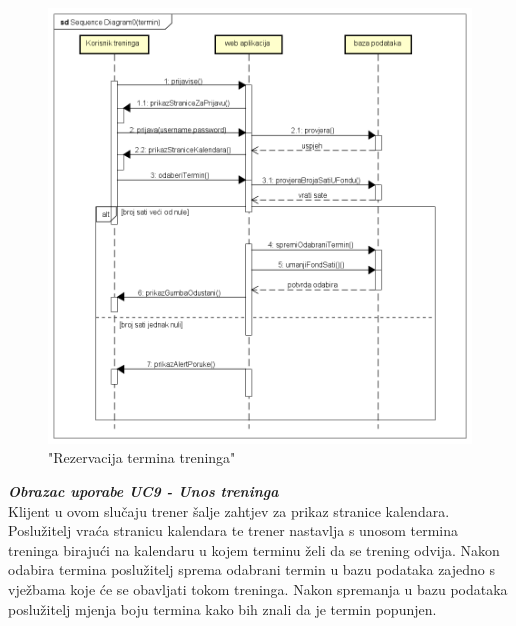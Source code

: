 {				
				\begin{figure}[H]
					\includegraphics[scale=0.6]{dijagrami/UC7fixedsequental.png} %
					\centering
					\caption{"Rezervacija termina treninga"}
					\label{fig:sekvencijski2}
				\end{figure}
				
				\eject
				
				\textbf{\textit{Obrazac uporabe UC9 - Unos treninga}}\\
				
				
				{Klijent u ovom slučaju trener šalje zahtjev za prikaz stranice kalendara. Poslužitelj vraća stranicu kalendara te trener nastavlja s unosom termina treninga birajući na kalendaru u kojem terminu želi da se trening odvija. Nakon odabira termina poslužitelj sprema odabrani termin u bazu podataka zajedno s vježbama koje će se obavljati tokom treninga. Nakon spremanja u bazu podataka poslužitelj mjenja boju termina kako bih znali da je termin popunjen. }
				
}

